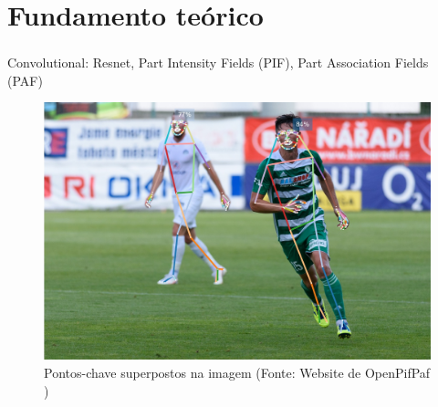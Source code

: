 \section{Fundamento teórico}



\begin{frame}
\frametitle{}
Convolutional: Resnet, Part Intensity Fields (PIF), Part Association Fields (PAF)
\begin{figure}[h!]
\centering
\includegraphics[width=0.65\linewidth]{images/soccer.jpeg.predictions.jpeg}
\caption{Pontos-chave superpostos na imagem (Fonte: Website de OpenPifPaf \cite{kreiss2019pifpaf})}%
\label{fig:soccer.predictions}
\end{figure} 
\end{frame}


